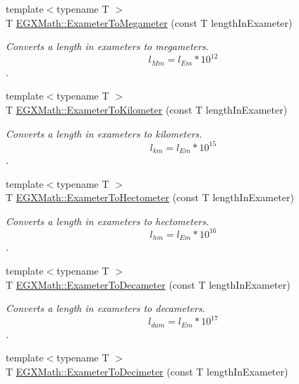 \begin{DoxyCompactItemize}
{\footnotesize template$<$typename T $>$ }\\T \mbox{\hyperlink{group___e_g_x_math-_conversions-_length_conversions-_s_i-_exameter-_s_i_gac3451985da098b2668e48c30468efd83}{E\+G\+X\+Math\+::\+Exameter\+To\+Megameter}} (const T length\+In\+Exameter)
\begin{DoxyCompactList}\small\item\em Converts a length in exameters to megameters. \[ l_{Mm}=l_{Em} * 10^{12} \]. \end{DoxyCompactList}\item 
{\footnotesize template$<$typename T $>$ }\\T \mbox{\hyperlink{group___e_g_x_math-_conversions-_length_conversions-_s_i-_exameter-_s_i_gad8c1732c3b4a07b330d5327c099bbd7c}{E\+G\+X\+Math\+::\+Exameter\+To\+Kilometer}} (const T length\+In\+Exameter)
\begin{DoxyCompactList}\small\item\em Converts a length in exameters to kilometers. \[ l_{km}=l_{Em} * 10^{15} \]. \end{DoxyCompactList}\item 
{\footnotesize template$<$typename T $>$ }\\T \mbox{\hyperlink{group___e_g_x_math-_conversions-_length_conversions-_s_i-_exameter-_s_i_gaa8f58d36da35b834499715694c75ce99}{E\+G\+X\+Math\+::\+Exameter\+To\+Hectometer}} (const T length\+In\+Exameter)
\begin{DoxyCompactList}\small\item\em Converts a length in exameters to hectometers. \[ l_{hm}=l_{Em} * 10^{16} \]. \end{DoxyCompactList}\item 
{\footnotesize template$<$typename T $>$ }\\T \mbox{\hyperlink{group___e_g_x_math-_conversions-_length_conversions-_s_i-_exameter-_s_i_ga06159c597dfa489a8981c261622bf574}{E\+G\+X\+Math\+::\+Exameter\+To\+Decameter}} (const T length\+In\+Exameter)
\begin{DoxyCompactList}\small\item\em Converts a length in exameters to decameters. \[ l_{dam}=l_{Em} * 10^{17} \]. \end{DoxyCompactList}\item 
{\footnotesize template$<$typename T $>$ }\\T \mbox{\hyperlink{group___e_g_x_math-_conversions-_length_conversions-_s_i-_exameter-_s_i_ga6d2909e8189cfc7b07d846a34f277afb}{E\+G\+X\+Math\+::\+Exameter\+To\+Decimeter}} (const T length\+In\+Exameter)

\end{DoxyCompactItemize}
